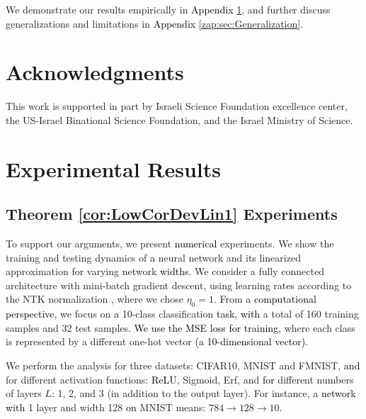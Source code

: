 \documentclass{article} %
\begin{document}
We demonstrate our results empirically in \textcolor{black}{Appendix} \ref{zap:Exp}, and further discuss generalizations and limitations in \textcolor{black}{Appendix} \ref{zap:sec:Generalization}. 

\section*{Acknowledgments}

This work is supported in part by Israeli Science Foundation excellence center, the US-Israel Binational Science Foundation, and the Israel Ministry of Science.







\newpage

\appendix

\section{Experimental Results}

\label{zap:Exp}

\subsection{Theorem \ref{cor:LowCorDevLin1} Experiments}


To support our arguments, we present \textcolor{black}{numerical} experiments. We show the training and testing dynamics of \textcolor{black}{a} neural network and its linearized approximation for varying network \textcolor{black}{widths}. We consider a fully connected architecture with mini-batch gradient descent, using learning rates according to the NTK normalization \cite{WideNNEvLinGD2019}, where we chose $\eta_0 = 1$. From \textcolor{black}{a computational perspective}, we focus on \textcolor{black}{a} 10-class classification \textcolor{black}{task}, \textcolor{black}{with} a total of 160 training samples and 32 test samples. \textcolor{black}{We use the MSE loss for training,} where each class is represented by a different one-hot vector \textcolor{black}{(a 10-dimensional vector)}.

We perform the analysis for three datasets: CIFAR10, MNIST and FMNIST, \textcolor{black}{and} for different activation functions: \textcolor{black}{ReLU}, Sigmoid, Erf, and \textcolor{black}{for} different numbers of layers $L$: 1, 2, and 3 (in addition to the output layer). For instance, \textcolor{black}{a network with} 1 layer and width 128 \textcolor{black}{on} MNIST means: $784 \rightarrow 128 \rightarrow 10$.
\end{document}
